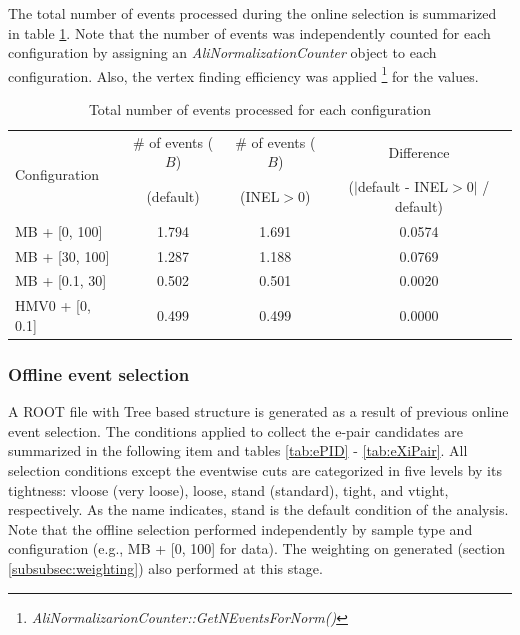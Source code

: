 The total number of events processed during the online selection is summarized in table \ref{tab:nEvents}.
Note that the number of events was independently counted for each configuration by assigning an \textit{AliNormalizationCounter} object to each configuration. Also, the vertex finding efficiency was applied \footnote{\textit{AliNormalizarionCounter::GetNEventsForNorm()}} for the values.

\vspace{\columnsep}
\begin{table}[h]
    \centering
    \small
    \begin{tabular}{l|c|c|c}
    \hline\hline
    \multirow{2}{*}{Configuration} & \# of events ($B$) & \# of events ($B$) & Difference \\
    & (default) & (INEL$>$0) & ($|$default - INEL$>$0$|$ / default) \\\hline
    MB + [0, 100]   & 1.794 & 1.691 & 0.0574 \\\hline
    MB + [30, 100]  & 1.287 & 1.188 & 0.0769 \\\hline
    MB + [0.1, 30]  & 0.502 & 0.501 & 0.0020 \\\hline
    HMV0 + [0, 0.1] & 0.499 & 0.499 & 0.0000 \\
    \hline\hline
    \end{tabular}
    \caption{Total number of events processed for each configuration}
    \label{tab:nEvents}
\end{table}





\vspace{\columnsep}
\subsubsection{Offline event selection} \label{subsubsec:offSel}
A ROOT file with Tree based structure is generated as a result of previous online event selection. The conditions applied to collect the e-\Xim pair candidates are summarized in the following item and tables \ref{tab:ePID} - \ref{tab:eXiPair}.
All selection conditions except the eventwise cuts are categorized in five levels by its tightness: vloose (very loose), loose, stand (standard), tight, and vtight, respectively. As the name indicates, stand is the default condition of the analysis.
Note that the offline selection performed independently by sample type and configuration (e.g., MB + [0, 100] for data). The weighting on generated \pt (section \ref{subsubsec:weighting}) also performed at this stage.

